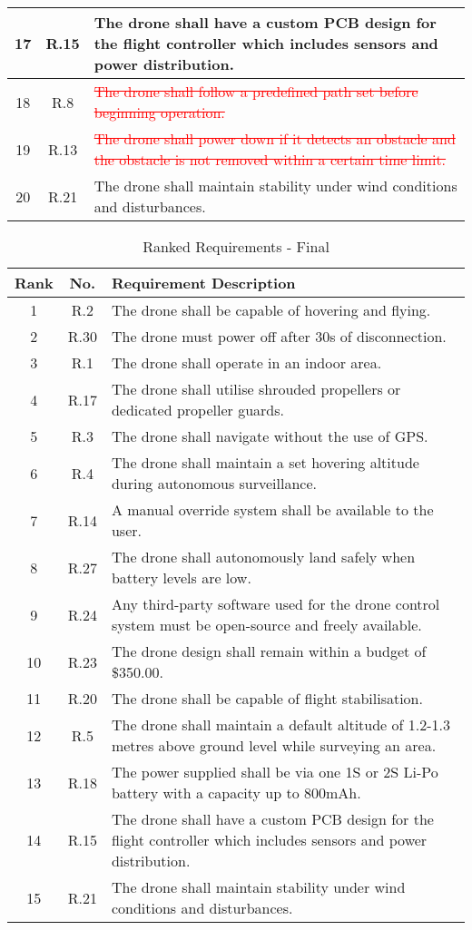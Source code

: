 \begin{table}[H]
\begin{tabular}{|c|c|p{11cm}|}
17 & R.15 & The drone shall have a custom PCB design for the flight controller which includes sensors and power distribution. \\ \hline
18 & R.8 & \textcolor{red}{\sout{The drone shall follow a predefined path set before beginning operation.}} \\ \hline
19 & R.13 & \textcolor{red}{\sout{The drone shall power down if it detects an obstacle and the obstacle is not removed within a certain time limit.}} \\ \hline
20 & R.21 & The drone shall maintain stability under wind conditions and disturbances. \\ \hline
\end{tabular}
\end{table}

\begin{table}[H]
\centering
\caption{Ranked Requirements - Final}
\begin{tabular}{|c|c|p{11cm}|}
\hline
\textbf{Rank} & \textbf{No.} & \textbf{Requirement Description} \\ \hline
1 & R.2 & The drone shall be capable of hovering and flying. \\ \hline
2 & R.30 & The drone must power off after 30s of disconnection. \\ \hline
3 & R.1 & The drone shall operate in an indoor area. \\ \hline
4 & R.17 & The drone shall utilise shrouded propellers or dedicated propeller guards. \\ \hline
5 & R.3 & The drone shall navigate without the use of GPS. \\ \hline
6 & R.4 & The drone shall maintain a set hovering altitude during autonomous surveillance. \\ \hline
7 & R.14 & A manual override system shall be available to the user. \\ \hline
8 & R.27 & The drone shall autonomously land safely when battery levels are low. \\ \hline
9 & R.24 & Any third-party software used for the drone control system must be open-source and freely available. \\ \hline
10 & R.23 & The drone design shall remain within a budget of \$350.00. \\ \hline
11 & R.20 & The drone shall be capable of flight stabilisation. \\ \hline
12 & R.5 & The drone shall maintain a default altitude of 1.2-1.3 metres above ground level while surveying an area. \\ \hline
13 & R.18 & The power supplied shall be via one 1S or 2S Li-Po battery with a capacity up to 800mAh. \\ \hline
14 & R.15 & The drone shall have a custom PCB design for the flight controller which includes sensors and power distribution. \\ \hline
15 & R.21 & The drone shall maintain stability under wind conditions and disturbances. \\ \hline
\end{tabular}
\end{table}

